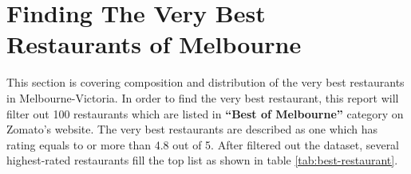 \documentclass[11pt,a4paper,]{article}
\begin{document}
\clearpage

\hypertarget{finding-the-very-best-restaurants-of-melbourne}{%
\section{Finding The Very Best Restaurants of Melbourne}\label{finding-the-very-best-restaurants-of-melbourne}}

This section is covering composition and distribution of the very best restaurants in Melbourne-Victoria. In order to find the very best restaurant, this report will filter out 100 restaurants which are listed in \textbf{``Best of Melbourne''} category on Zomato's website. The very best restaurants are described as one which has rating equals to or more than 4.8 out of 5.
After filtered out the dataset, several highest-rated restaurants fill the top list as shown in table \ref{tab:best-restaurant}.
\end{document}
